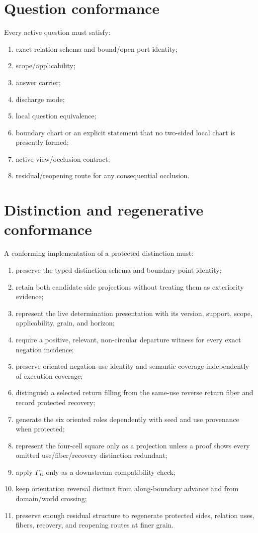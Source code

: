 \documentclass[11pt,oneside]{article}
\begin{document}
\section{Question conformance}

Every active question must satisfy:
\begin{enumerate}
\item exact relation-schema and bound/open port identity;
\item scope/applicability;
\item answer carrier;
\item discharge mode;
\item local question equivalence;
\item boundary chart or an explicit statement that no two-sided local chart is presently formed;
\item active-view/occlusion contract;
\item residual/reopening route for any consequential occlusion.
\end{enumerate}


\section{Distinction and regenerative conformance}

A conforming implementation of a protected distinction must:
\begin{enumerate}
\item preserve the typed distinction schema and boundary-point identity;
\item retain both candidate side projections without treating them as exteriority evidence;
\item represent the live determination presentation with its version, support, scope, applicability, grain, and horizon;
\item require a positive, relevant, non-circular departure witness for every exact negation incidence;
\item preserve oriented negation-use identity and semantic coverage independently of execution coverage;
\item distinguish a selected return filling from the same-use reverse return fiber and record protected recovery;
\item generate the six oriented roles dependently with seed and use provenance when protected;
\item represent the four-cell square only as a projection unless a proof shows every omitted use/fiber/recovery distinction redundant;
\item apply \(\Gamma_D\) only as a downstream compatibility check;
\item keep orientation reversal distinct from along-boundary advance and from domain/world crossing;
\item preserve enough residual structure to regenerate protected sides, relation uses, fibers, recovery, and reopening routes at finer grain.
\end{enumerate}
\end{document}
